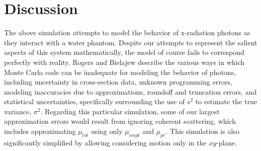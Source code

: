 \documentclass[12pt]{article} %
\begin{document}
\section*{Discussion}
The above simulation attempts to model the behavior of x-radiation photons as they interact with a water phantom. Despite our attempts to represent the salient aspects of this system mathematically, the model of course fails to correspond perfectly with reality. Rogers and Bielajew \cite{rogers1990} describe the various ways in which Monte Carlo code can be inadequate for modeling the behavior of photons, including uncertainty in cross-section data, unknown programming errors, modeling inaccuracies due to approximations, roundoff and truncation errors, and statistical uncertainties, specifically surrounding the use of $s^{2}$ to estimate the true variance, $\sigma^{2}$. Regarding this particular simulation, some of our largest approximation errors would result from ignoring coherent scattering, which includes approximating $\mu_{tot}$ using only $\mu_{cmpt}$ and $\mu_{pe}$. This simulation is also significantly simplified by allowing considering motion only in the $xy$\nobreakdash-plane.


\newpage


\end{document}
